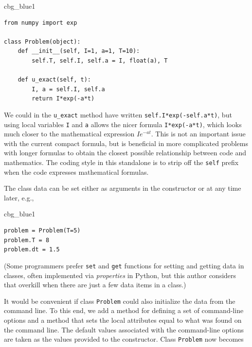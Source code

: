 \documentclass[%
oneside,                 %
final,                   %
10pt]{article}
\newenvironment{_cod_tight}[1]{
   \def\FrameCommand{\colorbox{#1}}
   \FrameRule0.6pt\MakeFramed {\FrameRestore}\vskip3mm}
   {\vskip0mm\endMakeFramed}
\newenvironment{cod}[1]{
\bgroup\rmfamily
\fboxsep=0mm\relax
\begin{_cod_tight}{#1}
\list{}{\parsep=-2mm\parskip=0mm\topsep=0pt\leftmargin=2mm
\rightmargin=2\leftmargin\leftmargin=4pt\relax}
\item\relax}
{\endlist\end{_cod_tight}\egroup}
\begin{document}
\begin{cod}{cbg_blue1}\begin{Verbatim}[numbers=none,fontsize=\fontsize{9pt}{9pt},baselinestretch=0.95,xleftmargin=2mm]
from numpy import exp

class Problem(object):
    def __init__(self, I=1, a=1, T=10):
        self.T, self.I, self.a = I, float(a), T

    def u_exact(self, t):
        I, a = self.I, self.a
        return I*exp(-a*t)
\end{Verbatim}
\end{cod}
\noindent
We could in the \Verb!u_exact! method have written
\texttt{self.I*exp(-self.a*t)}, but using local variables \texttt{I} and \texttt{a} allows
the nicer formula \texttt{I*exp(-a*t)}, which looks much closer to the mathematical
expression $Ie^{-at}$.  This is not an important issue with the
current compact formula, but is beneficial in more complicated
problems with longer formulas to obtain the closest possible
relationship between code and mathematics. The coding style in
this standalone is to strip
off the \texttt{self} prefix when the code expresses mathematical formulas.

The class data can be set either as arguments in the constructor or
at any time later, e.g.,

\begin{cod}{cbg_blue1}\begin{Verbatim}[numbers=none,fontsize=\fontsize{9pt}{9pt},baselinestretch=0.95,xleftmargin=2mm]
problem = Problem(T=5)
problem.T = 8
problem.dt = 1.5
\end{Verbatim}
\end{cod}
\noindent
(Some programmers prefer \texttt{set} and \texttt{get} functions for setting and getting
data in classes, often implemented via \emph{properties} in Python, but
this author considers that overkill when there are just a few data items
in a class.)

It would be convenient if class \texttt{Problem} could also initialize
the data from the command line. To this end, we add a method for
defining a set of command-line options and a method that sets the
local attributes equal to what was found on the command line.
The default values associated with the command-line options are taken
as the values provided to the constructor. Class \texttt{Problem} now becomes
\end{document}
